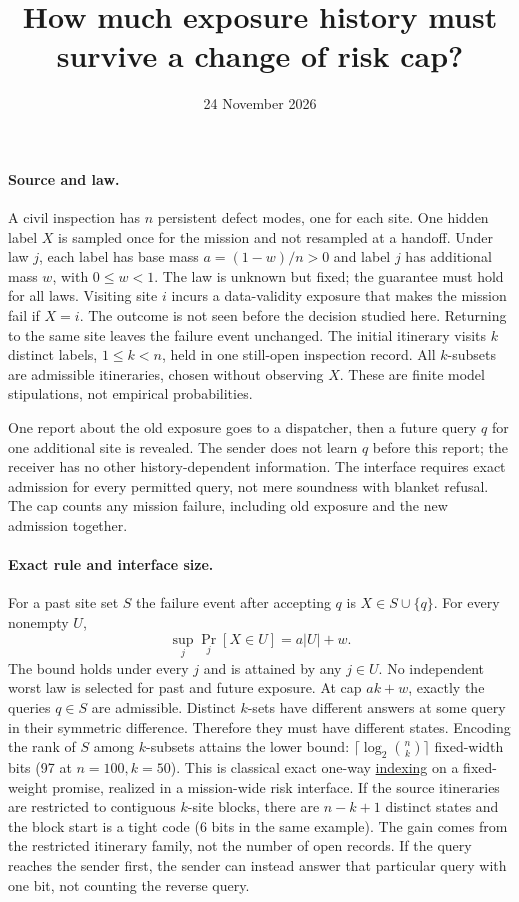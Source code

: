 \documentclass[11pt]{article}
\title{How much exposure history must survive a change of risk cap?}
\date{24 November 2026}
\begin{document}
\maketitle
\paragraph{Source and law.}
A civil inspection has \(n\) persistent defect modes, one for each site.
One hidden label \(X\) is sampled once for the mission and not resampled
at a handoff. Under law \(j\), each label has base mass \(a=(1-w)/n>0\)
and label \(j\) has additional mass \(w\), with \(0\leq w<1\).
The law is unknown but fixed; the guarantee must hold for all laws.
Visiting site \(i\) incurs a data-validity exposure that makes the
mission fail if \(X=i\). The outcome is not seen before the decision
studied here. Returning to the same site leaves the failure event
unchanged. The initial itinerary visits \(k\) distinct labels,
\(1\leq k<n\), held in one still-open inspection record.
All \(k\)-subsets are admissible itineraries, chosen without observing
\(X\). These are finite model stipulations, not empirical probabilities.

One report about the old exposure goes to a dispatcher, then a future
query \(q\) for one additional site is revealed. The sender does not
learn \(q\) before this report; the receiver has no other history-dependent
information. The interface requires exact admission for every permitted
query, not mere soundness with blanket refusal. The cap counts any mission
failure, including old exposure and the new admission together.

\paragraph{Exact rule and interface size.}
For a past site set \(S\) the failure event after accepting \(q\) is
\(X\in S\cup\{q\}\). For every nonempty \(U\),
\[
  \sup_j\Pr_j[X\in U]=a|U|+w.
\]
The bound holds under every \(j\) and is attained by any \(j\in U\).
No independent worst law is selected for past and future exposure.
At cap \(ak+w\), exactly the queries \(q\in S\) are admissible.
Distinct \(k\)-sets have different answers at some query in their
symmetric difference. Therefore they must have different states.
Encoding the rank of \(S\) among \(k\)-subsets attains the lower bound:
\(\lceil\log_2\binom nk\rceil\) fixed-width bits (97 at \(n=100,k=50\)).
This is classical exact one-way \href{https://arxiv.org/abs/1509.06257}{indexing}
on a fixed-weight promise, realized in a mission-wide risk interface.
If the source itineraries are restricted to contiguous \(k\)-site blocks,
there are \(n-k+1\) distinct states and the block start is a tight code
(6 bits in the same example). The gain comes from the restricted
itinerary family, not the number of open records.
If the query reaches the sender first, the sender can instead answer
that particular query with one bit, not counting the reverse query.
\end{document}
